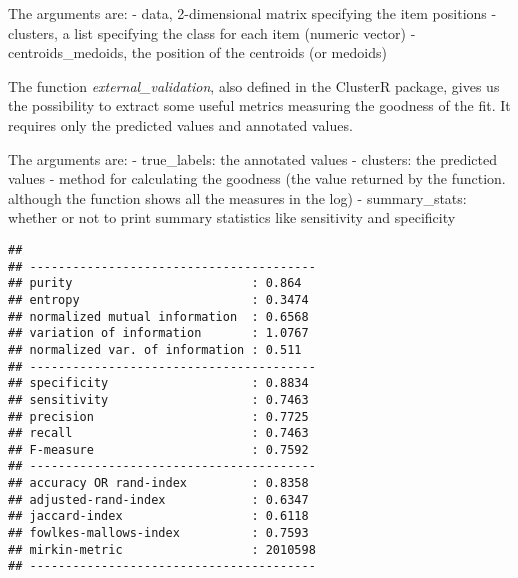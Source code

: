 \documentclass[
]{article}
\newenvironment{Shaded}{\begin{snugshade}}{\end{snugshade}}
\newcommand{\AttributeTok}[1]{\textcolor[rgb]{0.77,0.63,0.00}{#1}}
\newcommand{\FunctionTok}[1]{\textcolor[rgb]{0.00,0.00,0.00}{#1}}
\newcommand{\NormalTok}[1]{#1}
\newcommand{\SpecialCharTok}[1]{\textcolor[rgb]{0.00,0.00,0.00}{#1}}
\begin{document}
The arguments are: - data, 2-dimensional matrix specifying the item
positions - clusters, a list specifying the class for each item (numeric
vector) - centroids\_medoids, the position of the centroids (or medoids)

\begin{Shaded}
\end{Shaded}

The function \emph{external\_validation}, also defined in the ClusterR
package, gives us the possibility to extract some useful metrics
measuring the goodness of the fit. It requires only the predicted values
and annotated values.

The arguments are: - true\_labels: the annotated values - clusters: the
predicted values - method for calculating the goodness (the value
returned by the function. although the function shows all the measures
in the log) - summary\_stats: whether or not to print summary statistics
like sensitivity and specificity

\begin{Shaded}
\end{Shaded}

\begin{verbatim}
##  
## ---------------------------------------- 
## purity                         : 0.864 
## entropy                        : 0.3474 
## normalized mutual information  : 0.6568 
## variation of information       : 1.0767 
## normalized var. of information : 0.511 
## ---------------------------------------- 
## specificity                    : 0.8834 
## sensitivity                    : 0.7463 
## precision                      : 0.7725 
## recall                         : 0.7463 
## F-measure                      : 0.7592 
## ---------------------------------------- 
## accuracy OR rand-index         : 0.8358 
## adjusted-rand-index            : 0.6347 
## jaccard-index                  : 0.6118 
## fowlkes-mallows-index          : 0.7593 
## mirkin-metric                  : 2010598 
## ----------------------------------------
\end{verbatim}
\end{document}
